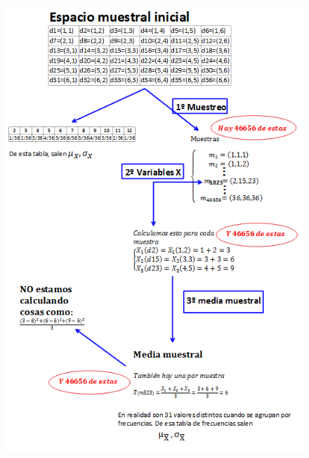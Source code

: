 \begin{ejemplo}
\begin{figure}[p]
\begin{center}
\begin{enColor}
\includegraphics[width=13cm]{../fig/cap06-DiagramaMuestreoDosDados.png}
\end{enColor}
\begin{bn}

\end{bn}
\end{center}
\end{figure}
\end{ejemplo}
